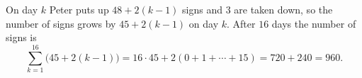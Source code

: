 On day $k$ Peter puts up $48+2(k-1)$ signs and $3$ are taken down, so the number of signs grows by $45+2(k-1)$ on day $k$. After $16$ days the number of signs is
\[
\sum_{k=1}^{16}\bigl(45+2(k-1)\bigr)=16\cdot45+2(0+1+\cdots+15)=720+240=\boxed{960}.
\]

